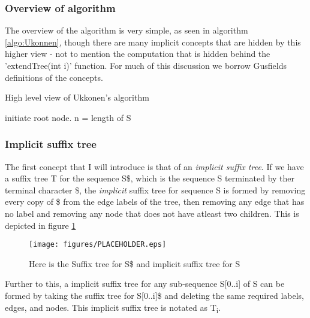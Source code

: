 \documentclass[12pt,twoside,notitlepage]{report}
\begin{document}
				\subsubsection{Overview of algorithm}
				The overview of the algorithm is very simple, as seen in algorithm \ref{algo:Ukonnen}, though there are many implicit concepts that are hidden by this higher view - not to mention the computation that is hidden behind the 'extendTree(int i)' function. For much of this discussion we borrow Gusfields\cite{Gusfeild1999} definitions of the concepts.
				
				\begin{algorithm}
				\caption{High level view of Ukkonen's algorithm}
				\label{algo:Ukonnen}
				\begin{algorithmic}[1]
						\State initiate root node.
						\State n = length of S
						\For{i from 0 to n}
								\State{extendTree(i)}


						\EndFor


					\EndProcedure
				\end{algorithmic}
				\end{algorithm}
				
				\subsubsection{Implicit suffix tree}
				The first concept that I will introduce is that of an \emph{implicit suffix tree}. If we have a suffix tree T for the sequence S\$, which is the sequence S terminated by ther terminal character \$, the \emph{implicit} suffix tree for sequence S is formed by removing every copy of \$ from the edge labels of the tree, then removing any edge that has no label and removing any node that does not have atleast two children. This is depicted in figure \ref{fig:implicitSuffixTree}
				
				\begin{figure}[h]
			\centerline{\texttt{[image: figures/PLACEHOLDER.eps]}}
			\caption{\label{fig:implicitSuffixTree} Here is the Suffix tree for S\$ and implicit suffix tree for S}
\end{figure}

				Further to this, a implicit suffix tree for any sub-sequence S[0..i] of S can be formed by taking the suffix tree for S[0..i]\$ and deleting the same required labels, edges, and nodes. This implicit suffix tree is notated as T\textsubscript{i}.
				
\end{document}
